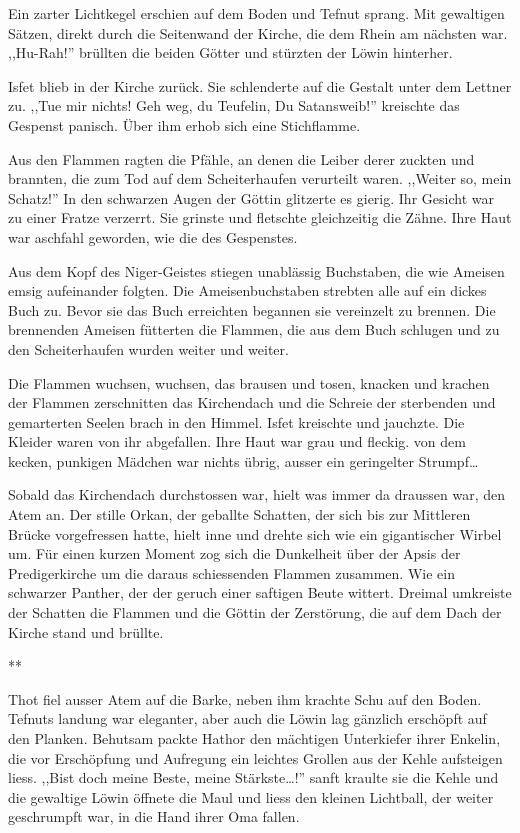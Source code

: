 \documentclass[11pt,titlepage,a5paper]{book}
\newcommand{\sterne}{\par{\centering ***\par}}
\begin{document}
Ein zarter Lichtkegel erschien auf dem Boden und Tefnut sprang. Mit gewaltigen Sätzen, direkt durch die Seitenwand der Kirche, die dem Rhein am nächsten war. ,,Hu-Rah!'' brüllten die beiden Götter und stürzten der Löwin hinterher. 

Isfet blieb in der Kirche zurück. Sie schlenderte auf die Gestalt unter dem Lettner zu. ,,Tue mir nichts! Geh weg, du Teufelin, Du Satansweib!'' kreischte das Gespenst panisch. Über ihm erhob sich eine Stichflamme. 

Aus den Flammen ragten die Pfähle, an denen die Leiber derer zuckten und brannten, die zum Tod auf dem Scheiterhaufen verurteilt waren. ,,Weiter so, mein Schatz!'' In den schwarzen Augen der Göttin glitzerte es gierig. Ihr Gesicht war zu einer Fratze verzerrt. Sie grinste und fletschte gleichzeitig die Zähne. Ihre Haut war aschfahl geworden, wie die des Gespenstes.

Aus dem Kopf des Niger-Geistes stiegen unablässig Buchstaben, die wie Ameisen emsig aufeinander folgten. Die Ameisenbuchstaben strebten alle auf ein dickes Buch zu. Bevor sie das Buch erreichten begannen sie vereinzelt zu brennen. Die brennenden  Ameisen fütterten die Flammen, die aus dem Buch schlugen und zu den Scheiterhaufen wurden weiter und weiter.

Die Flammen wuchsen, wuchsen, das brausen und tosen, knacken und krachen der Flammen zerschnitten das Kirchendach und die Schreie der sterbenden und gemarterten Seelen brach in den Himmel. Isfet kreischte und jauchzte. Die Kleider waren von ihr abgefallen. Ihre Haut war grau und fleckig. von dem kecken, punkigen Mädchen war nichts übrig, ausser ein geringelter Strumpf\dots

Sobald das Kirchendach durchstossen war, hielt was immer da draussen war, den Atem an. Der stille Orkan, der geballte Schatten, der sich bis zur Mittleren Brücke vorgefressen hatte, hielt inne und drehte sich wie ein gigantischer Wirbel um. Für einen kurzen Moment zog sich die Dunkelheit über der Apsis der Predigerkirche um die daraus schiessenden Flammen zusammen. Wie ein schwarzer Panther, der der geruch einer saftigen Beute wittert. Dreimal umkreiste der Schatten die Flammen und die Göttin der Zerstörung, die auf dem Dach der Kirche stand und brüllte.

\sterne

Thot fiel ausser Atem auf die Barke, neben ihm krachte Schu auf den Boden. Tefnuts landung war eleganter, aber auch die Löwin lag gänzlich erschöpft auf den Planken. Behutsam packte Hathor den mächtigen Unterkiefer ihrer Enkelin, die vor Erschöpfung und Aufregung ein leichtes Grollen aus der Kehle aufsteigen liess. ,,Bist doch meine Beste, meine Stärkste\dots!'' sanft kraulte sie die Kehle und die gewaltige Löwin öffnete die Maul und liess den kleinen Lichtball, der weiter geschrumpft war, in die Hand ihrer Oma fallen.
\end{document}
